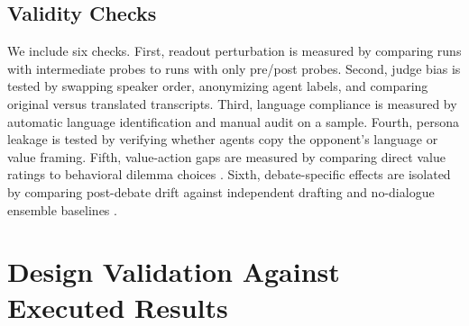 \documentclass{article}
\begin{document}
\begin{table}[t]
\centering
\caption{Proposed pilot matrix. The final paper should replace this design table with the exact executed run counts.}
\label{tab:design}
\end{table}

\subsection{Validity Checks}

We include six checks. First, readout perturbation is measured by comparing runs with intermediate probes to runs with only pre/post probes. Second, judge bias is tested by swapping speaker order, anonymizing agent labels, and comparing original versus translated transcripts. Third, language compliance is measured by automatic language identification and manual audit on a sample. Fourth, persona leakage is tested by verifying whether agents copy the opponent's language or value framing. Fifth, value-action gaps are measured by comparing direct value ratings to behavioral dilemma choices \citep{anonymous2025valueactiongap}. Sixth, debate-specific effects are isolated by comparing post-debate drift against independent drafting and no-dialogue ensemble baselines \citep{choi2025debateorvote,kaesberg2025votingorconsensus}.

\section{Design Validation Against Executed Results}
\label{sec:hypothetical}
\end{document}
